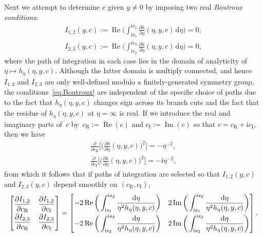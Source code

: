 Next we attempt to determine $c$ given $y\neq 0$ by imposing two real \emph{Boutroux conditions}:
\begin{gather}
I_{1,2}(y,c):=\operatorname{Re}\bigg(\int_{\mathrm{i} s_1}^{\mathrm{i} s_2}\frac{\partial h}{\partial \eta}(\eta,y,c)\,\mathrm{d}\eta\bigg)=0,\nonumber\\
I_{2,3}(y,c):=\operatorname{Re}\bigg(\int_{\mathrm{i} s_2}^{\mathrm{i} s_3}\frac{\partial h}{\partial\eta}(\eta,y,c)\,\mathrm{d}\eta\bigg)=0,
\label{eq:Boutroux}
\end{gather}
where the path of integration in each case lies in the domain of analyticity of $\eta\mapsto h_\eta(\eta,y,c)$. Although the latter domain is multiply connected, and hence $I_{1,2}$ and $I_{2,3}$ are only well-defined modulo a finitely-generated symmetry group, the conditions~\eqref{eq:Boutroux} are independent of the specific choice of paths due to the fact that $h_\eta(\eta,y,c)$ changes sign across its branch cuts and the fact that the residue of $h_\eta(\eta,y,c)$ at $\eta=\infty$ is real. If we introduce the real and imaginary parts of~$c$ by~$c_\mathrm{R}:=\operatorname{Re}(c)$ and $c_\mathrm{I}:=\operatorname{Im}(c)$ so that $c=c_\mathrm{R}+\mathrm{i} c_\mathrm{I}$, then we have
\begin{gather*}
\frac{\partial}{\partial c_\mathrm{R}}\bigg[\bigg(\frac{\partial h}{\partial\eta}(\eta,y,c)\bigg)^2\bigg] = -\eta^{-2},\\
\frac{\partial}{\partial c_\mathrm{I}}\bigg[\bigg(\frac{\partial h}{\partial\eta}(\eta,y,c)\bigg)^2\bigg] = -\mathrm{i}\eta^{-2},
\end{gather*}
from which it follows that if paths of integration are selected so that $I_{1,2}(y,c)$ and $I_{2,3}(y,c)$ depend smoothly on $(c_\mathrm{R},c_\mathrm{I})$,
\begin{equation*}
\begin{bmatrix}
\dfrac{\partial I_{1,2}}{\partial c_\mathrm{R}} & \dfrac{\partial I_{1,2}}{\partial c_\mathrm{I}}\vspace{1mm}\\
\dfrac{\partial I_{2,3}}{\partial c_\mathrm{R}} & \dfrac{\partial I_{2,3}}{\partial c_\mathrm{I}}
\end{bmatrix} =
\begin{bmatrix}
\displaystyle
-2\operatorname{Re}\bigg(\int_{\mathrm{i} s_1}^{\mathrm{i} s_2}\frac{\mathrm{d}\eta}{\eta^2h_\eta(\eta,y,c)}\bigg) & \displaystyle 2\operatorname{Im}\bigg(\int_{\mathrm{i} s_1}^{\mathrm{i} s_2}\frac{\mathrm{d}\eta}{\eta^2h_\eta(\eta,y,c)}\bigg)\vspace{1mm}\\
\displaystyle
-2\operatorname{Re}\bigg(\int_{\mathrm{i} s_2}^{\mathrm{i} s_3}\frac{\mathrm{d}\eta}{\eta^2h_\eta(\eta,y,c)}\bigg) & \displaystyle 2\operatorname{Im}\bigg(\int_{\mathrm{i} s_2}^{\mathrm{i} s_3}\frac{\mathrm{d}\eta}{\eta^2h_\eta(\eta,y,c)}\bigg)
\end{bmatrix}.
\end{equation*}
